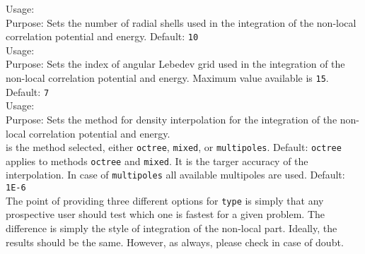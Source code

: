{
  \noindent
  Usage:  \\[1.0ex] 
  Purpose: Sets
  the number of radial shells used in the integration of the non-local
  correlation potential and energy. Default: \texttt{10}\\
}
{
  \noindent
  Usage:  \\[1.0ex] 
  Purpose:
  Sets the index of angular Lebedev grid used in the integration of
  the non-local correlation potential and energy. Maximum value
  available is \texttt{15}. Default: \texttt{7}\\ 
}
{
  \noindent
  Usage:  
  \\[1.0ex] 
  Purpose: Sets the method for density
  interpolation for the integration of the non-local correlation
  potential and energy.\\[1.0ex] 
   is the method selected,
  either \texttt{octree}, \texttt{mixed}, or \texttt{multipoles}.
  Default: \texttt{octree}\\[1.0ex] 
   applies to
  methods \texttt{octree} and \texttt{mixed}. It is the targer
  accuracy of the interpolation. In case of \texttt{multipoles} all
  available multipoles are used. Default: \texttt{1E-6}\\
}
The point of providing three different options for \texttt{type} is
simply that any prospective user should test which one is fastest for
a given problem. The difference is simply the style of integration of
the non-local part. Ideally, the results should be the same. However,
as always, please check in case of doubt.
